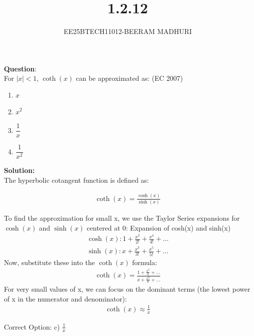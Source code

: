 \documentclass[journal]{IEEEtran}
\begin{document}

\vspace{3cm}

\title{1.2.12}
\author{EE25BTECH11012-BEERAM MADHURI}
{\let\newpage\relax\maketitle}

\renewcommand{\thefigure}{\theenumi}
\renewcommand{\thetable}{\theenumi}
\setlength{\intextsep}{10pt} %


\renewcommand{\thetable}{\theenumi}


\textbf{Question}:\\
For $|x| < 1$, $\coth(x)$ can be approximated as: \hfill (EC 2007)

\begin{enumerate}
    \item[a)] $x$
    \item[b)] $x^2$
    \item[c)] $\dfrac{1}{x}$
    \item[d)] $\dfrac{1}{x^2}$
\end{enumerate}


\textbf{Solution:}\\
The hyperbolic cotangent function is defined as:

\begin{align}
    \coth(x) = \frac{\cosh(x)}{\sinh(x)}
\end{align}

To find the approximation for small x, we use the Taylor Series expansions for $\cosh(x)$ and $\sinh(x)$ centered at 0:
Expansion of cosh(x) and sinh(x)
\begin{align}
    \cosh(x): 1 + \frac{x^2}{2!} + \frac{x^4}{4!} + \dots\\
    \sinh(x): x + \frac{x^3}{3!} + \frac{x^5}{5!} + \dots
\end{align}
Now, substitute these into the $\coth(x)$ formula:
\begin{align}
    \coth(x) = \frac{1 + \frac{x^2}{2} + \dots}{x + \frac{x^3}{6} + \dots}
\end{align}
For very small values of x, we can focus on the dominant terms (the lowest power of x in the numerator and denominator):
\begin{align}
    \coth(x) \approx \frac{1}{x}
\end{align}

Correct Option: c) $\frac{1}{x}$
\end{document}
